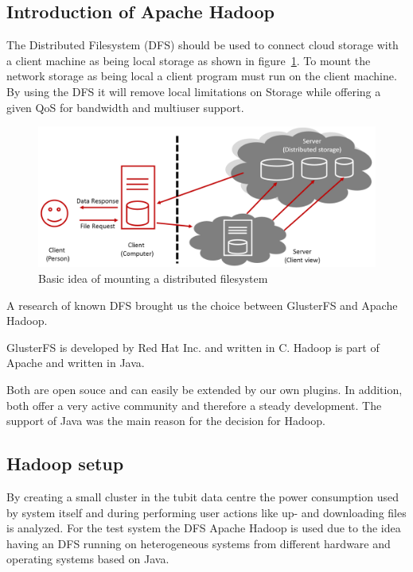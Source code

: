 \subsection{Introduction of Apache Hadoop}

The Distributed Filesystem (DFS) should be used to connect cloud storage with a client machine as being local storage as shown in figure~\ref{fig:dfs_example}. To mount the network storage as being local a client program must run on the client machine. By using the DFS it will remove local limitations on Storage while offering a given QoS for bandwidth and multiuser support.


\begin{figure}
	\centering
	\includegraphics[width=1\linewidth]{img/dfs_example.png}
	\caption{Basic idea of mounting a distributed filesystem}
	\label{fig:dfs_example}
\end{figure}

A research of known DFS brought us the choice between GlusterFS and Apache Hadoop.

GlusterFS is developed by Red Hat Inc. and written in C. Hadoop is part of Apache and written in Java.

Both are open souce and can easily be extended by our own plugins. In addition, both offer a very active community and therefore a steady development. The support of Java was the main reason for the decision for Hadoop.

\subsection{Hadoop setup}

By creating a small cluster in the tubit data centre the power consumption used by system itself and during performing user actions like up- and downloading files is analyzed. For the test system the DFS Apache Hadoop is used due to the idea having an DFS running on heterogeneous systems from different hardware and operating systems based on Java. 

